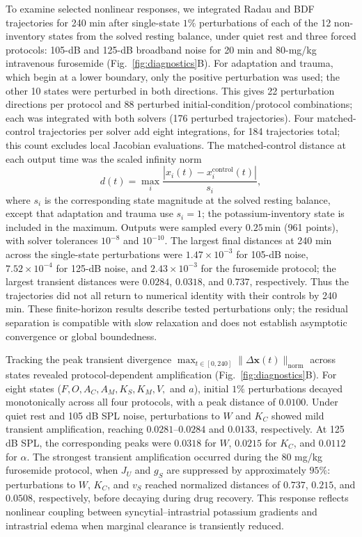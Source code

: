 \documentclass[final,5p,times]{elsarticle}
\begin{document}
To examine selected nonlinear responses, we integrated Radau and BDF trajectories for 240 min after single-state \(1\%\) perturbations of each of the 12 non-inventory states from the solved resting balance, under quiet rest and three forced protocols: 105-dB and 125-dB broadband noise for 20 min and 80-mg/kg intravenous furosemide (Fig.~\ref{fig:diagnostics}B). For adaptation and trauma, which begin at a lower boundary, only the positive perturbation was used; the other 10 states were perturbed in both directions. This gives 22 perturbation directions per protocol and 88 perturbed initial-condition/protocol combinations; each was integrated with both solvers (176 perturbed trajectories). Four matched-control trajectories per solver add eight integrations, for 184 trajectories total; this count excludes local Jacobian evaluations. The matched-control distance at each output time was the scaled infinity norm
\[
d(t)=\max_i \frac{|x_i(t)-x_i^{\mathrm{control}}(t)|}{s_i},
\]
where \(s_i\) is the corresponding state magnitude at the solved resting balance, except that adaptation and trauma use \(s_i=1\); the potassium-inventory state is included in the maximum. Outputs were sampled every \(0.25\,\mathrm{min}\) (961 points), with solver tolerances \(10^{-8}\) and \(10^{-10}\). The largest final distances at 240 min across the single-state perturbations were \(1.47\times10^{-3}\) for 105-dB noise, \(7.52\times10^{-4}\) for 125-dB noise, and \(2.43\times10^{-3}\) for the furosemide protocol; the largest transient distances were \(0.0284\), \(0.0318\), and \(0.737\), respectively. Thus the trajectories did not all return to numerical identity with their controls by 240 min. These finite-horizon results describe tested perturbations only; the residual separation is compatible with slow relaxation and does not establish asymptotic convergence or global boundedness.

Tracking the peak transient divergence \(\max_{t \in [0,240]} \|\Delta \mathbf{x}(t)\|_{\mathrm{norm}}\) across states revealed protocol-dependent amplification (Fig.~\ref{fig:diagnostics}B). For eight states (\(F, O, A_C, A_M, K_S, K_M, V,\) and \(a\)), initial \(1\%\) perturbations decayed monotonically across all four protocols, with a peak distance of \(0.0100\). Under quiet rest and 105 dB SPL noise, perturbations to \(W\) and \(K_C\) showed mild transient amplification, reaching \(0.0281\)--\(0.0284\) and \(0.0133\), respectively. At 125 dB SPL, the corresponding peaks were \(0.0318\) for \(W\), \(0.0215\) for \(K_C\), and \(0.0112\) for \(\alpha\). The strongest transient amplification occurred during the 80 mg/kg furosemide protocol, when \(J_U\) and \(g_S\) are suppressed by approximately \(95\%\): perturbations to \(W\), \(K_C\), and \(v_S\) reached normalized distances of \(0.737\), \(0.215\), and \(0.0508\), respectively, before decaying during drug recovery. This response reflects nonlinear coupling between syncytial--intrastrial potassium gradients and intrastrial edema when marginal clearance is transiently reduced.
\end{document}
